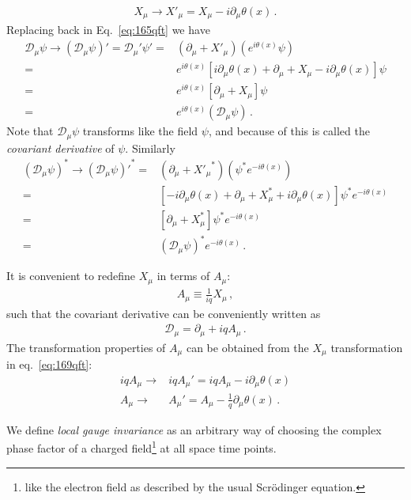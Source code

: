 \begin{align}
\label{eq:169qft}
X_\mu\to  X'_\mu=X_\mu-i\partial_\mu\theta(x)\,.
\end{align}
Replacing back in Eq.~\eqref{eq:165qft} we have
\begin{align}
    \mathcal{D}_\mu \psi\to\left(\mathcal{D}_\mu \psi\right)'=\mathcal{D}_\mu' \psi'=&(\partial_\mu+X'_\mu) \left(e^{i\theta(x)}\psi\right)\nonumber\\
=&e^{i\theta(x)}\left[i\partial_\mu \theta(x)+\partial_\mu+X_\mu-i\partial_\mu\theta(x) \right]\psi\nonumber\\
=&e^{i\theta(x)}\left[\partial_\mu+X_\mu\right]\psi\nonumber\\
=&e^{i\theta(x)}\left(\mathcal{D}_\mu\psi\right)\,.
\end{align}
Note that $\mathcal{D}_\mu\psi$ transforms like the field $\psi$, and because of this is called the \emph{covariant derivative} of $\psi$.
Similarly
\begin{align}
    (\mathcal{D}_\mu \psi)^*\to{\left(\mathcal{D}_\mu \psi\right)'}^*=&(\partial_\mu+{X'_\mu}^*) \left(\psi^*e^{-i\theta(x)}\right)\nonumber\\
=&\left[-i\partial_\mu \theta(x)+\partial_\mu+X_\mu^*+i\partial_\mu\theta(x) \right]\psi^*e^{-i\theta(x)}\nonumber\\
=&\left[\partial_\mu+X_\mu^*\right]\psi^*e^{-i\theta(x)}\nonumber\\
=&\left(\mathcal{D}_\mu\psi\right)^*e^{-i\theta(x)}\,.
\end{align}

It is convenient to redefine $X_\mu$ in terms of $A_\mu$:
\begin{align}
  A_\mu\equiv\frac{1}{i q}X_\mu\,,
\end{align}
such that the covariant derivative can be conveniently written as
\begin{align}
\label{eq:170qft}
  \mathcal{D}_\mu=\partial_\mu+i q A_\mu\,.
\end{align}
The transformation properties of $A_\mu$ can be obtained from the $X_\mu$ transformation in eq.~\eqref{eq:169qft}: 
\begin{align}
\label{eq:159qft}
 i q A_\mu\to& i q A_\mu'=i q A_\mu-i \partial_\mu\theta(x)\nonumber\\
  A_\mu\to&  A_\mu'= A_\mu-\frac{1}{q} \partial_\mu\theta(x)\,.
\end{align}


We define \emph{local gauge invariance} as an arbitrary way of choosing the complex phase factor of a charged field\footnote{like the electron field as described by the usual Scrödinger equation.} at all space time points.

